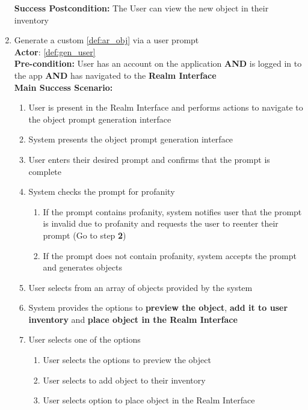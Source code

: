 \documentclass{article}
\begin{document}
\begin{enumerate}[label=\textbf{UC\arabic*}]
\begin{itemize}
        \end{itemize}
        \textbf{Success Postcondition:} The User can view the new object in their inventory
        
    \item \label{uc:6} Generate a custom \ref{def:ar_obj} via a user prompt \\
        \textbf{Actor}: \ref{def:gen_user} \\
        \textbf{Pre-condition:} User has an account on the application \textbf{AND} is logged in to the app \textbf{AND} has navigated to the \textbf{Realm Interface} \\

        \textbf{Main Success Scenario:}
        \begin{enumerate}[label=\textbf{\arabic*.}]
            \item User is present in the Realm Interface and performs actions to navigate to the object prompt generation interface
            \item System presents the object prompt generation interface
            \item User enters their desired prompt and confirms that the prompt is complete
            \item System checks the prompt for profanity
            \begin{enumerate}[label=(\alph*)]
                \item If the prompt contains profanity, system notifies user that the prompt is invalid due to profanity and requests the user to reenter their prompt (Go to step \textbf{2})
                \item If the prompt does not contain profanity, system accepts the prompt and generates objects
            \end{enumerate}
            \item User selects from an array of objects provided by the system
            \item System provides the options to \textbf{preview the object}, \textbf{add it to user inventory} and \textbf{place object in the Realm Interface}
            \item User selects one of the options
            \begin{enumerate}[label=(\alph*)]
                \item User selects the options to preview the object
                \item User selects to add object to their inventory
                \item User selects option to place object in the Realm Interface

\end{enumerate}
\end{enumerate}
\end{enumerate}
\end{document}

